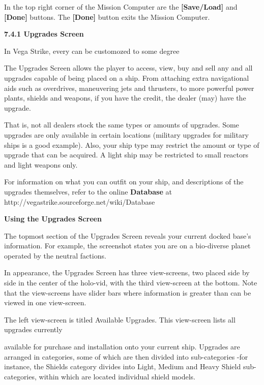\documentclass{article}
\begin{document}
In the top right corner of the Mission Computer are the \textbf{[Save/Load] }and \textbf{[Done] }buttons. The \textbf{[Done] }button exits the Mission Computer. 

\textbf{}

\textbf{}

\textbf{}

\textbf{}

\textbf{7.4.1 Upgrades Screen }

In Vega Strike, every can be customozed to some degree



The Upgrades Screen allows the player to access, view, buy and sell any and all upgrades capable of being placed on a ship. From attaching extra navigational aids such as overdrives, maneuvering jets and thrusters, to more powerful power plants, shields and weapons, if you have the credit, the dealer (may) have the upgrade. 

That is, not all dealers stock the same types or amounts of upgrades. Some upgrades are only available in certain locations (military upgrades for military ships is a good example). Also, your ship type may restrict the amount or type of upgrade that can be acquired. A light ship may be restricted to small reactors and light weapons only. 

For information on what you can outfit on your ship, and descriptions of the upgrades themselves, refer to the online \textbf{Database} at http://vegastrike.sourceforge.net/wiki/Database

 



\textbf{Using the Upgrades Screen }

The topmost section of the Upgrades Screen reveals your current docked base's information. For example, the screenshot states you are on a bio-diverse planet operated by the neutral factions. 

In appearance, the Upgrades Screen has three view-screens, two placed side by side in the center of the holo-vid, with the third view-screen at the bottom. Note that the view-screens have slider bars where information is greater than can be viewed in one view-screen. 

The left view-screen is titled Available Upgrades. This view-screen lists all upgrades currently 

available for purchase and installation onto your current ship. Upgrades are arranged in categories, some of which are then divided into sub-categories -for instance, the Shields category divides into Light, Medium and Heavy Shield sub-categories, within which are located individual shield models. 
\end{document}
